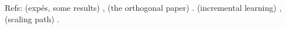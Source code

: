 Refs: (expés, some results) \citep{maennel2018gradient}, (the orthogonal paper) \citep{boursierGradientFlowDynamics2022}. (incremental learning) \citep{berthierIncrementalLearningDiagonal}, (scaling path) \citep{neumayerEffectInitializationScaling2023}.


%
